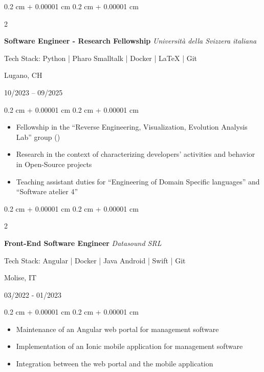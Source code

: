 \documentclass[10pt, letterpaper]{article}
\newenvironment{highlights}{
    \begin{itemize}[
        topsep=0.10 cm,
        parsep=0.10 cm,
        partopsep=0pt,
        itemsep=0pt,
        leftmargin=0.4 cm + 10pt
    ]
}{
    \end{itemize}
} %
\newenvironment{onecolentry}{
    \begin{adjustwidth}{
        0.2 cm + 0.00001 cm
    }{
        0.2 cm + 0.00001 cm
    }
}{
    \end{adjustwidth}
} %
\newenvironment{twocolentry}[2][]{
    \onecolentry
    \def\secondColumn{#2}
    \setcolumnwidth{\fill, 4.5 cm}
    \begin{paracol}{2}
}{
    \switchcolumn \raggedleft \secondColumn
    \end{paracol}
    \endonecolentry
} %
\let\hrefWithoutArrow\href
\renewcommand{\href}[2]{\hrefWithoutArrow{#1}{\ifthenelse{\equal{#2}{}}{ }{#2 }\raisebox{.15ex}{\footnotesize \faExternalLink*}}}
\begin{document}
         \begin{twocolentry}{
        Lugano, CH
        
        10/2023 – 09/2025}
            \textbf{Software Engineer - Research Fellowship} \textit{Università della Svizzera italiana}

            {\footnotesize Tech Stack: Python | Pharo Smalltalk | Docker | LaTeX | Git}
        \end{twocolentry}

        \vspace{0.10 cm}
                \begin{onecolentry}
            \begin{highlights}
                \item Fellowship in the ``Reverse Engineering, Visualization, Evolution Analysis Lab'' group (\href{https://reveal.si.usi.ch/}{REVEAL})
                \item Research in the context of characterizing developers' activities and behavior in Open-Source projects
                \item Teaching assistant duties for ``Engineering of Domain Specific languages'' and ``Software atelier 4'' 
            \end{highlights}
        \end{onecolentry}
        \vspace{0.2 cm}

        \begin{twocolentry}{
        Molise, IT
            
        03/2022 - 01/2023}
            \textbf{Front-End Software Engineer} \textit{Datasound SRL}

            {\footnotesize Tech Stack: Angular | Docker | Java Android | Swift | Git}
        \end{twocolentry}

        \vspace{0.10 cm}
        \begin{onecolentry}
            \begin{highlights}
                \item Maintenance of an Angular web portal for management software
                \item Implementation of an Ionic mobile application for management software
                \item Integration between the web portal and the mobile application
            \end{highlights}
        \end{onecolentry}
\end{document}
